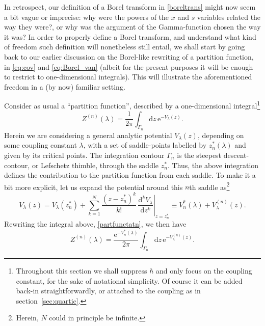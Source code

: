 \documentclass[11pt,a4paper]{article}
\newcommand{\be}{\begin{equation}}
\newcommand{\ee}{\end{equation}}
\newcommand{\rme}{{\mathrm{e}}}
\newcommand{\rmd}{{\mathrm{d}}}
\begin{document}
In retrospect, our definition of a Borel transform in \eqref{boreltrans} might now seem a bit vague or imprecise: why were the powers of the $x$ and $s$ variables related the way they were?, or why was the argument of the Gamma-function chosen the way it was? In order to properly define a Borel transform, and understand what kind of freedom such definition will nonetheless still entail, we shall start by going back to our earlier discussion on the Borel-like rewriting of a partition function, in \eqref{eq:cov} and \eqref{eq:Borel_van} (albeit for the present purposes it will be enough to restrict to one-dimensional integrals). This will illustrate the aforementioned freedom in a (by now) familiar setting.

Consider as usual a ``partition function'', described by a one-dimensional integral\footnote{Throughout this section we shall suppress $\hbar$ and only focus on the coupling constant, for the sake of notational simplicity. Of course it can be added back-in straightforwardly, or attached to the coupling as in section~\ref{sec:quartic}.}
%
\begin{equation}
\label{partfunctatn}
Z^{(n)}(\lambda) = \frac{1}{2\pi} \int_{\Gamma_{n}} \rmd z\, \rme^{-V_\lambda(z)}.
\end{equation}
%
\noindent
Herein we are considering a general analytic potential $V_\lambda (z)$, depending on some coupling constant $\lambda$, with a set of saddle-points labelled by $z^*_{n} (\lambda)$ and given by its critical points. The integration contour $\Gamma_{n}$ is the steepest descent-contour, or Lefschetz thimble, through the saddle $z^*_{n}$. Thus, the above integration defines the contribution to the partition function from each saddle. To make it a bit more explicit, let us expand the potential around this $n$th saddle as\footnote{Herein, $N$ could in principle be infinite.}
%
\be
V_\lambda (z) = V_\lambda (z^*_{n}) + \sum_{k=1}^N \frac{\left( z - z^*_{n} \right)^k}{k!}\, \left. \frac{\rmd^k V_\lambda}{\rmd z^k} \right|_{z= z^*_{n}} \equiv V^*_n (\lambda) + V_\lambda^{(n)} (z).
\ee
%
\noindent
Rewriting the integral above, \eqref{partfunctatn}, we then have
%
\begin{equation}
Z^{(n)} (\lambda) = \frac{\rme^{- V^*_n (\lambda)}}{2\pi} \int_{\Gamma_{n}} \rmd z\, \rme^{- V_\lambda^{(n)} (z)}.
\end{equation}
\end{document}
